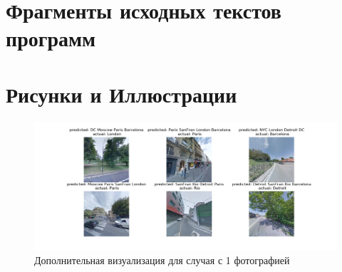 \chapter{Фрагменты исходных текстов программ}\label{app-format}







\chapter{Рисунки и Иллюстрации}\label{morefigs}

\begin{figure}[h]
	\centering
	\includegraphics[width=0.9\linewidth]{img/add_vis}
	\caption{Дополнительная визуализация для случая с 1 фотографией}
	\label{fig:addvis}
\end{figure}

